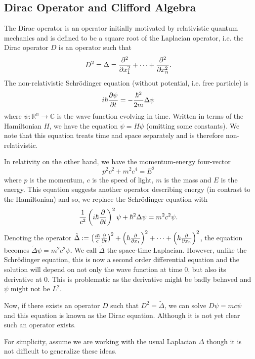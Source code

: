 \documentclass[]{article}
\theoremstyle{definition}
\theoremstyle{definition}
\begin{document}
\subsection{Dirac Operator and Clifford Algebra}

The Dirac operator is an operator initially motivated by relativistic quantum 
mechanics and is defined to be a square root of the Laplacian operator, i.e. 
the Dirac operator \(D\) is an operator such that 
\[D^2 = \Delta = \pdv[2]{x_1} + \cdots + \pdv[2]{x_n}.\]
The non-relativistic Schrödinger equation (without potential, i.e. free particle) 
is 
\[i\hbar \pdv{\psi}{t} = - \frac{\hbar^2}{2m} \Delta \psi\]
where \(\psi : \mathbb{R}^n \to \mathbb{C}\) is the wave function evolving in 
time. Written in terms of the Hamiltonian \(H\), we have the equation 
\(\dot \psi = H\psi\) (omitting some constants). We note that this equation 
treats time and space separately and is therefore non-relativistic.

In relativity on the other hand, we have the momentum-energy four-vector 
\[p^2 c^2 + m^2 c^4 = E^2\]
where \(p\) is the momentum, \(c\) is the speed of light, \(m\) is the mass 
and \(E\) is the energy. This equation suggests another operator describing 
energy (in contrast to the Hamiltonian) and so, we replace the 
Schrödinger equation with
\[\frac{1}{c^2}\left(i\hbar \pdv{t}\right)^2 \psi + \hbar^2 \Delta\psi = 
  m^2c^2 \psi.\]
Denoting the operator \(\tilde \Delta := 
\left(\frac{i \hbar}{c}\pdv{t}\right)^2 + \left(\hbar \pdv{x_1}\right)^2 + \cdots 
+ \left(\hbar \pdv{x_n}\right)^2\), the equation becomes \(\tilde \Delta \psi = 
m^2 c^2 \psi\). We call \(\tilde \Delta\) the space-time Laplacian. However, 
unlike the Schrödinger equation, this is now a second order differential equation 
and the solution will depend on not only the wave function at time 0, but also 
its derivative at 0. This is problematic as the derivative might be badly behaved 
and \(\psi\) might not be \(L^2\).

Now, if there exists an operator \(D\) such that \(D^2 = \tilde \Delta\), 
we can solve \(D\psi = mc \psi\) and this equation is known as the Dirac equation.
Although it is not yet clear such an operator exists.

For simplicity, assume we are working with the usual Laplacian \(\Delta\) though 
it is not difficult to generalize these ideas.
\end{document}

